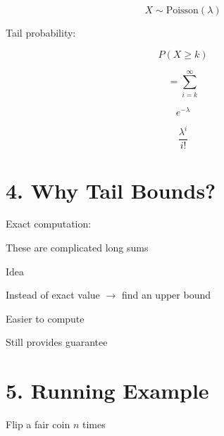 \documentclass[12pt]{article}
\begin{document}
\vspace{0.5em}

\[
X \sim \text{Poisson}(\lambda)
\]

\vspace{1em}

Tail probability:

\vspace{0.5em}

\[
P(X \geq k)
\]

\vspace{0.5em}

\[
= \sum_{i=k}^{\infty}
\]

\vspace{0.5em}

\[
e^{-\lambda}
\]

\vspace{0.5em}

\[
\frac{\lambda^i}{i!}
\]

\vspace{2em}

\section*{4. Why Tail Bounds?}

\vspace{0.5em}

Exact computation:

\vspace{0.5em}

These are complicated long sums

\vspace{1em}

Idea

\vspace{0.5em}

Instead of exact value $\rightarrow$ find an upper bound

Easier to compute

Still provides guarantee

\vspace{2em}

\section*{5. Running Example}

\vspace{0.5em}

Flip a fair coin $n$ times

\vspace{0.5em}
\end{document}
